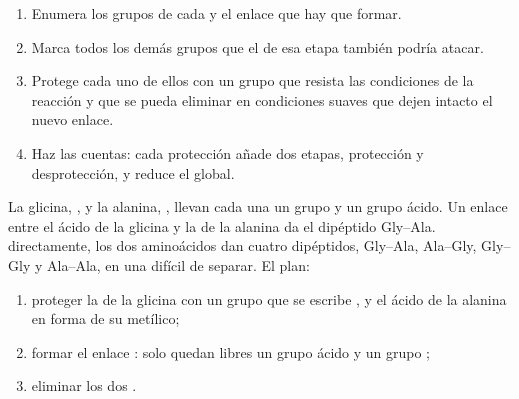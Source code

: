 \begin{method}\label{met:g12:synthesis-strategy:plan}
\begin{enumerate}
  \item Enumera los grupos de cada  y el enlace que hay que
        formar.
  \item Marca todos los demás grupos que el  de esa etapa también
        podría atacar.
  \item Protege cada uno de ellos con un grupo que resista las condiciones
        de la reacción y que se pueda eliminar en condiciones suaves que
        dejen intacto el nuevo enlace.
  \item Haz las cuentas: cada protección añade dos etapas, protección y
        desprotección, y reduce el  global.
\end{enumerate}
\end{method}

\begin{example}\label{ex:g12:synthesis-strategy:dipeptide}
La glicina, , y la alanina, ,
llevan cada una un grupo  y un grupo ácido. Un enlace  entre el
ácido de la glicina y la  de la alanina da el dipéptido Gly--Ala.
 directamente, los dos aminoácidos dan cuatro dipéptidos,
Gly--Ala, Ala--Gly, Gly--Gly y Ala--Ala, en una  difícil de
separar. El plan:
\begin{enumerate}
  \item proteger la  de la glicina con un grupo que se escribe
        , y el ácido de la alanina en forma de su  metílico;
  \item formar el enlace : solo quedan libres un grupo ácido y un
        grupo ;
  \item eliminar los dos .
\end{enumerate}
\end{example}

